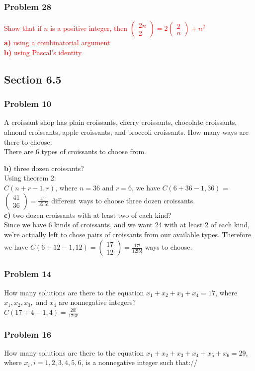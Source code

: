 \documentclass[fontsize=11pt]{scrartcl} %
\newcommand{\combination}[2]{
\begin{pmatrix}#1\\#2\end{pmatrix}
}
\begin{document}
\subsubsection*{Problem 28}
\textcolor{red}{
Show that if $n$ is a positive integer, then $\combination{2n}{2}= 2\combination{2}{n} + n^2$\\ 
\textbf{a)} using a combinatorial argument\\
\textbf{b)} using Pascal's identity\\
}
\subsection*{Section 6.5}
\subsubsection*{Problem 10}
A croissant shop has plain croissants, cherry croissants,
chocolate croissants, almond croissants, apple croissants, and broccoli croissants. How many ways are there to choose.\\

There are 6 types of croissants to choose from.

\textbf{b)} three dozen croissants?\\
Using theorem 2:\\ $C(n+r-1,r)$, where $n=36$ and $r=6$, we have $C(6+36-1, 36)$ = $\combination{41}{36} = \frac{41!}{35!5!}$ different ways to choose three dozen croissants.\\
 
\textbf{c)} two dozen croissants with at least two of each kind?\\
Since we have 6 kinds of croissants, and we want 24 with at least  2 of each kind, we're actually left to chose pairs of croissants from our available types. Therefore we have $C(6+12-1, 12) = \combination{17}{12} = \frac{17!}{12!5!}$ ways to choose.\\

\subsubsection*{Problem 14}
How many solutions are there to the equation $x_1 + x_2 + x_3 + x_4 = 17$,
where $x_1,x_2,x_3,$ and $x_4$ are nonnegative integers?\\

$C(17+4-1,4) = \frac{20!}{17!3!}$\\

\subsubsection*{Problem 16}
How many solutions are there to the equation $x_1 + x_2 + x_3 + x_4 + x_5 + x_6 = 29$,
where $x_i, i = 1, 2, 3, 4, 5, 6$, is a nonnegative integer such that://
\end{document}
